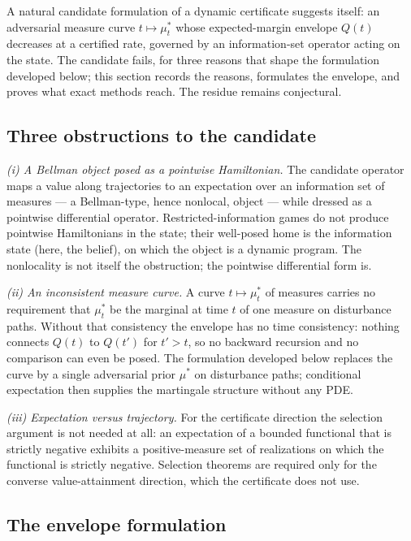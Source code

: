 \documentclass[10pt,twocolumn]{article}
\theoremstyle{definition}
\begin{document}
A natural candidate formulation of a dynamic certificate suggests itself: an adversarial measure curve $t \mapsto \mu^{*}_{t}$ whose expected-margin envelope $Q(t)$ decreases at a certified rate, governed by an information-set operator acting on the state. The candidate fails, for three reasons that shape the formulation developed below; this section records the reasons, formulates the envelope, and proves what exact methods reach. The residue remains conjectural.

\subsection{Three obstructions to the candidate}

\emph{(i) A Bellman object posed as a pointwise Hamiltonian.} The candidate operator maps a
value along trajectories to an expectation over an information set of
measures --- a Bellman-type, hence nonlocal, object --- while dressed as a
pointwise differential operator. Restricted-information games do not
produce pointwise Hamiltonians in the state; their well-posed home is the
information state (here, the belief), on which the object is a dynamic
program. The nonlocality is not itself the obstruction; the pointwise differential form is.

\emph{(ii) An inconsistent measure curve.} A curve $t \mapsto
\mu^{*}_{t}$ of measures carries no requirement that $\mu^{*}_{t}$ be the
marginal at time $t$ of one measure on disturbance paths. Without that
consistency the envelope has no time consistency: nothing connects $Q(t)$
to $Q(t')$ for $t' > t$, so no backward recursion and no comparison can
even be posed. The formulation developed below replaces the curve by a single adversarial prior $\mu^{*}$ on disturbance paths; conditional expectation then supplies
the martingale structure without any PDE.

\emph{(iii) Expectation versus trajectory.} For the certificate direction
the selection argument is not needed at all: an expectation of a bounded
functional that is strictly negative exhibits a positive-measure set of
realizations on which the functional is strictly negative. Selection
theorems are required only for the converse value-attainment direction,
which the certificate does not use.

\subsection{The envelope formulation}
\end{document}

